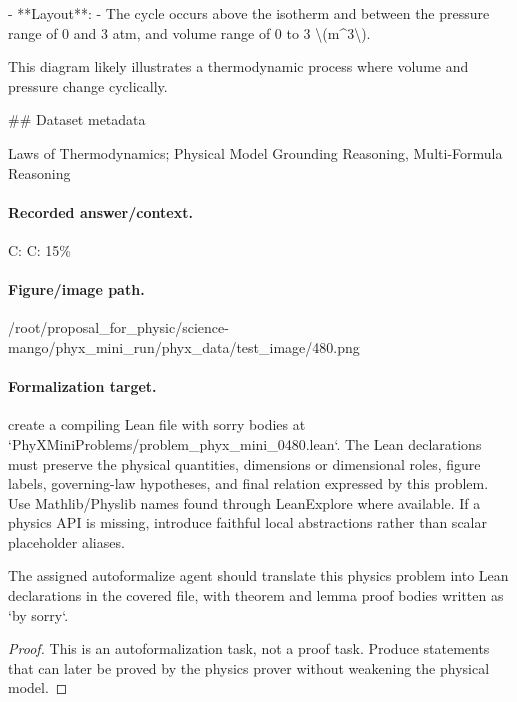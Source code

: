 - **Layout**:
  - The cycle occurs above the isotherm and between the pressure range of 0 and 3 atm, and volume range of 0 to 3 \textbackslash{}(m\textasciicircum{}3\textbackslash{}). 

This diagram likely illustrates a thermodynamic process where volume and pressure change cyclically.

\#\# Dataset metadata

Laws of Thermodynamics; Physical Model Grounding Reasoning, Multi-Formula Reasoning

\paragraph{Recorded answer/context.}
C: C: 15\%

\paragraph{Figure/image path.}
/root/proposal\_for\_physic/science-mango/phyx\_mini\_run/phyx\_data/test\_image/480.png

\paragraph{Formalization target.}
create a compiling Lean file with sorry bodies at `PhyXMiniProblems/problem\_phyx\_mini\_0480.lean`. The Lean declarations must preserve the physical quantities, dimensions or dimensional roles, figure labels, governing-law hypotheses, and final relation expressed by this problem.
Use Mathlib/Physlib names found through LeanExplore where available. If a physics API is missing, introduce faithful local abstractions rather than scalar placeholder aliases.

\begin{theorem}
\label{thm:physics:phyx_mini_0480:target}
The assigned autoformalize agent should translate this physics problem into Lean declarations in the covered file, with theorem and lemma proof bodies written as `by sorry`.
\end{theorem}
\begin{proof}
This is an autoformalization task, not a proof task. Produce statements that can later be proved by the physics prover without weakening the physical model.
\end{proof}

